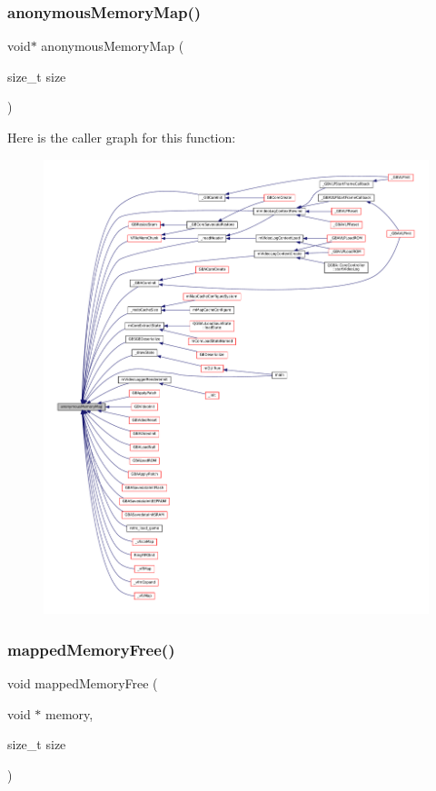 \subsubsection{\texorpdfstring{anonymous\+Memory\+Map()}{anonymousMemoryMap()}}
{\footnotesize\ttfamily void$\ast$ anonymous\+Memory\+Map (\begin{DoxyParamCaption}\item[{size\+\_\+t}]{size }\end{DoxyParamCaption})}

Here is the caller graph for this function\+:
\nopagebreak
\begin{figure}[H]
\begin{center}
\leavevmode
\includegraphics[width=350pt]{3ds-memory_8c_a5d8b8a54c5a5972efba2981636430417_icgraph}
\end{center}
\end{figure}
\mbox{\label{3ds-memory_8c_a3542970c4da761e3d6985de6d36d83d3}} 
\subsubsection{\texorpdfstring{mapped\+Memory\+Free()}{mappedMemoryFree()}}
{\footnotesize\ttfamily void mapped\+Memory\+Free (\begin{DoxyParamCaption}\item[{void $\ast$}]{memory,  }\item[{size\+\_\+t}]{size }\end{DoxyParamCaption})}

